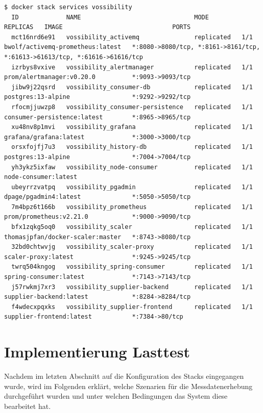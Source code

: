 \begin{lstlisting}[style=javaStyle,caption={Dockerfile - Supplier},label=lst:supplierDockerfile]
  $ docker stack services vossibility
  ID             NAME                               MODE         REPLICAS   IMAGE                              PORTS
  mct16nrd6e91   vossibility_activemq               replicated   1/1        bwolf/activemq-prometheus:latest   *:8080->8080/tcp, *:8161->8161/tcp, *:61613->61613/tcp, *:61616->61616/tcp
  izrbys8vxive   vossibility_alertmanager           replicated   1/1        prom/alertmanager:v0.20.0          *:9093->9093/tcp
  jibw9j22qsrd   vossibility_consumer-db            replicated   1/1        postgres:13-alpine                 *:9292->9292/tcp
  rfocmjjuwzp8   vossibility_consumer-persistence   replicated   1/1        consumer-persistence:latest        *:8965->8965/tcp
  xu48nv8p1mvi   vossibility_grafana                replicated   1/1        grafana/grafana:latest             *:3000->3000/tcp
  orsxfojfj7u3   vossibility_history-db             replicated   1/1        postgres:13-alpine                 *:7004->7004/tcp
  yh3ykz5ixfaw   vossibility_node-consumer          replicated   1/1        node-consumer:latest
  ubeyrrzvatpq   vossibility_pgadmin                replicated   1/1        dpage/pgadmin4:latest              *:5050->5050/tcp
  7m4bpz6t166b   vossibility_prometheus             replicated   1/1        prom/prometheus:v2.21.0            *:9000->9090/tcp
  bfx1zqkg5oq0   vossibility_scaler                 replicated   1/1        thomasjpfan/docker-scaler:master   *:8743->8080/tcp
  32bd0chtwvjg   vossibility_scaler-proxy           replicated   1/1        scaler-proxy:latest                *:9245->9245/tcp
  twrq504kngog   vossibility_spring-consumer        replicated   1/1        spring-consumer:latest             *:7143->7143/tcp
  j57rwkmj7xr3   vossibility_supplier-backend       replicated   1/1        supplier-backend:latest            *:8284->8284/tcp
  f4wdecxpqxks   vossibility_supplier-frontend      replicated   1/1        supplier-frontend:latest           *:7384->80/tcp
\end{lstlisting}

\section{Implementierung Lasttest \checkmark}
Nachdem im letzten Abschnitt auf die Konfiguration des Stacks eingegangen wurde, wird im Folgenden erklärt, welche Szenarien für die Messdatenerhebung durchgeführt wurden und unter welchen Bedingungen das System diese bearbeitet hat.

